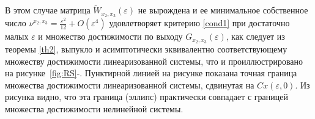 \documentclass[../main.tex]{subfiles}
\begin{document}
\begin{enumerate}
        В этом случае матрица $ \widetilde{W}_{x_2,x_3}(\varepsilon) $ не вырождена и ее минимальное собственное число $ \nu^{x_2,x_3} = \frac{\varepsilon^2}{12} + O(\varepsilon^4)  $ удовлетворяет критерию \eqref{cond1} при достаточно малых $ \varepsilon $ и множество достижимости по выходу $ G_{x_2,x_3}(\varepsilon) $, как следует из теоремы \ref{th2}, выпукло и асимптотически эквивалентно соответствующему множеству достижимости линеаризованной системы, что и проиллюстрировано на рисунке~\ref{fig:RS}-. Пунктирной линией на рисунке показана точная граница множества достижимости линеаризованной системы, сдвинутая на $ Cx(\varepsilon, 0) $. Из рисунка видно, что эта граница (эллипс) практически совпадает с границей множества достижимости нелинейной системы.
    \end{enumerate} 
    
\end{document}
